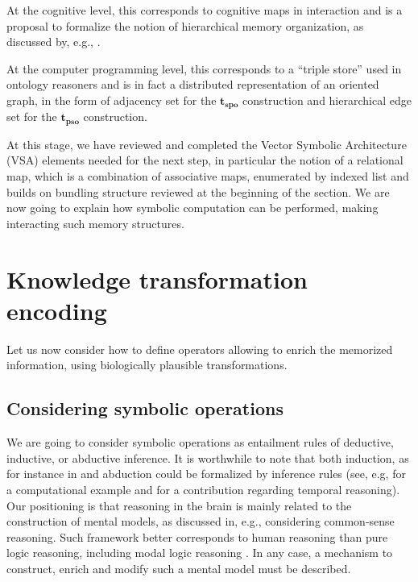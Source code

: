 \documentclass[sn-mathphys]{sn-jnl}
\begin{document}
At the cognitive level, this corresponds to cognitive maps in interaction and is a proposal to formalize the notion of hierarchical memory organization, as discussed by, e.g., \cite{eichenbaum_memory_2017}.

At the computer programming level, this corresponds to a ``triple store'' used in ontology reasoners and is in fact a distributed representation of an oriented graph, in the form of adjacency set for the $\mathbf{t}_{\mathbf{spo}}$ construction and hierarchical edge set for the $\mathbf{t}_{\mathbf{pso}}$ construction.

At this stage, we have reviewed and completed the Vector Symbolic Architecture (VSA) elements needed for the next step, in particular the notion of a relational map, which is a combination of associative maps, enumerated by indexed list and builds on bundling structure reviewed at the beginning of the section. We are now going to explain how symbolic computation can be performed, making interacting such memory structures.

\section{Knowledge transformation encoding} \label{transformation}

Let us now consider how to define operators allowing to enrich the memorized information, using biologically plausible transformations.

\subsection{Considering symbolic operations}

We are going to consider symbolic operations as entailment rules of deductive, inductive, or abductive inference. It is worthwhile to note that both induction, as for instance in \cite{domingos_unifying_1996} and abduction could be formalized by inference rules (see, e.g, \cite{lakkaraju_rule_2000} for a computational example and \cite{shanahan_abductive_2000} for a contribution regarding temporal reasoning). Our positioning is that reasoning in the brain is mainly related to the construction of mental models, as discussed in, e.g., \cite{khemlani_causal_2014} considering common-sense reasoning. Such framework better corresponds to human reasoning than pure logic reasoning, including modal logic reasoning \cite{ragni_reasoning_2018}. In any case, a mechanism to construct, enrich and modify such a mental model must be described.
\end{document}
